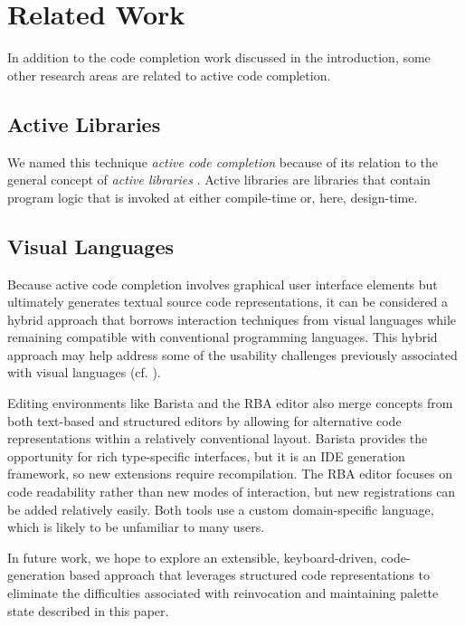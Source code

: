 \documentclass[10pt, conference, compsocconf]{IEEEtran}
\begin{document}
\section{Related Work}
In addition to the code completion work discussed in the introduction, some other research areas are related to active code completion. 
\subsection{Active Libraries}
We named this technique {\it active code completion} because of its relation to the general concept of {\it active libraries} \cite{activelibraries}. Active libraries are libraries that contain program logic that is invoked at either compile-time or, here, design-time. 

\subsection{Visual Languages}
Because active code completion involves graphical user interface elements but ultimately generates textual source code representations, it can be considered a hybrid approach that borrows interaction techniques from visual languages while remaining compatible with conventional programming languages. This hybrid approach may help address some of the usability challenges previously associated with visual languages (cf. \cite{doi:10.1080/1049482940040202}).

Editing environments like Barista \cite{Ko06} and the RBA editor \cite{RBA} also merge concepts from both text-based and structured editors by allowing for alternative code representations within a relatively conventional layout. Barista provides the opportunity for rich type-specific interfaces, but it is an IDE generation framework, so new extensions require recompilation. The RBA editor focuses on code readability rather than new modes of interaction, but new registrations can be added relatively easily. Both tools use a custom domain-specific language, which is likely to be unfamiliar to many users. 

In future work, we hope to explore an extensible, keyboard-driven, code-generation based approach that leverages structured code representations to eliminate the difficulties associated with reinvocation and maintaining palette state described in this paper.
\end{document}
